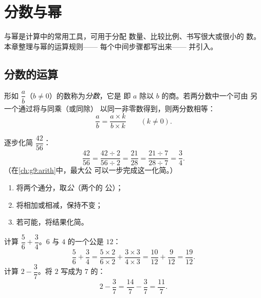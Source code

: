 \chapter{分数与幂}\label{ch:g9:fractions}

与幂是计算中的常用工具，可用于分配
数量、比较比例、书写很大或很小的
数。本章整理与幂的运算规则——
每个中间步骤都写出来——
并引入。

\section{分数的运算}

\begin{definition}[分数]\label{def:g9:fractions:fraction}
形如 $\dfrac ab$（$b \neq 0$）的数称为\emph{分数}，它是
即 $a$ 除以 $b$ 的商。若两分数中一个可由
另一个通过将与同乘（或同除）
以同一非零数得到，则两分数相等：
\[
\frac ab = \frac{a \times k}{b \times k} \qquad (k \neq 0).
\]
\end{definition}

\begin{example}\label{ex:g9:fractions:simplify}
逐步化简 $\dfrac{42}{56}$：
\[
\frac{42}{56} = \frac{42 \div 2}{56 \div 2} = \frac{21}{28}
= \frac{21 \div 7}{28 \div 7} = \frac34 .
\]
（在\cref{ch:g9:arith}中，最大公
可以一步完成这一化简。）
\end{example}

\begin{method}[分数的加减法]\label{met:g9:fractions:add}
\begin{enumerate}
  \item 将两个通分，取\emph{公}（两个的
        公）；
  \item 将相加或相减，保持不变；
  \item 若可能，将结果化简。
\end{enumerate}
\end{method}

\begin{example}\label{ex:g9:fractions:add}
计算 $\dfrac56 + \dfrac34$。$6$ 与 $4$ 的一个公是
$12$：
\[
\frac56 + \frac34
= \frac{5 \times 2}{6 \times 2} + \frac{3 \times 3}{4 \times 3}
= \frac{10}{12} + \frac{9}{12}
= \frac{19}{12}.
\]
计算 $2 - \dfrac37$。将 $2$ 写成为 $7$ 的：
\[
2 - \frac37 = \frac{14}{7} - \frac37 = \frac{11}{7}.
\]
\end{example}

